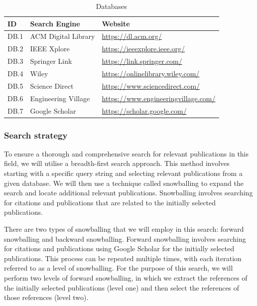 \documentclass[conference]{IEEEtran}
\begin{document}
\begin{table}[!htb] \caption{Databases} \label{tab:databases}
  \begin{center}
    \begin{tabular}[c]{l|l|l} \textbf{ID} & \textbf{Search Engine} &
      \textbf{Website} \\
      \hline DB.1 & ACM Digital Library & \url{https://dl.acm.org/} \\
      \hline DB.2 & IEEE Xplore & \url{https://ieeexplore.ieee.org/} \\
      \hline DB.3 & Springer Link & \url{https://link.springer.com/} \\
      \hline DB.4 & Wiley & \url{https://onlinelibrary.wiley.com/} \\
      \hline DB.5 & Science Direct & \url{https://www.sciencedirect.com/} \\
      \hline DB.6 & Engineering Village &
      \url{https://www.engineeringvillage.com/} \\
      \hline DB.7 & Google Scholar & \url{https://scholar.google.com/} \\
    \end{tabular}
  \end{center}
\end{table}

\subsubsection{Search strategy}

To ensure a thorough and comprehensive search for relevant publications in this
field, we will utilise a breadth-first search approach. This method involves
starting with a specific query string and selecting relevant publications from
a given database. We will then use a technique called snowballing to expand the
search and locate additional relevant publications. Snowballing involves
searching for citations and publications that are related to the initially
selected publications.

There are two types of snowballing that we will employ in this search: forward
snowballing and backward snowballing. Forward snowballing involves searching
for citations and publications using Google Scholar for the initially selected
publications. This process can be repeated multiple times, with each iteration
referred to as a level of snowballing. For the purpose of this search, we will
perform two levels of forward snowballing, in which we extract the references
of the initially selected publications (level one) and then select the
references of those references (level two).
\end{document}
